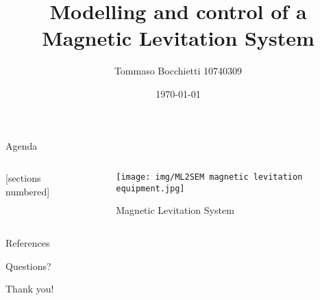 \documentclass[9pt]{beamer}
\title{Modelling and control of a Magnetic Levitation System}
\date{\today}
\author{Tommaso Bocchietti 10740309}
\institute{Politecnico di Milano}
\begin{document}
\maketitle

\begin{frame}{Agenda}

    \begin{columns}[c, onlytextwidth]

        \begin{column}{0.5\textwidth}

            [sections numbered]
            \tableofcontents

        \end{column}

        \begin{column}{0.5\textwidth}

            \begin{figure}[H]
                \centering
                \texttt{[image: img/ML2SEM magnetic levitation equipment.jpg]}
                \caption{Magnetic Levitation System}
            \end{figure}

        \end{column}

    \end{columns}

\end{frame}


% 
% 
% 
% 
% 

\appendix

\begin{frame}[allowframebreaks]{References}
    \nocite{*}
    
\end{frame}

\begin{frame}[standout]
    Questions?
\end{frame}

\begin{frame}[standout]
    Thank you!
\end{frame}
\end{document}
